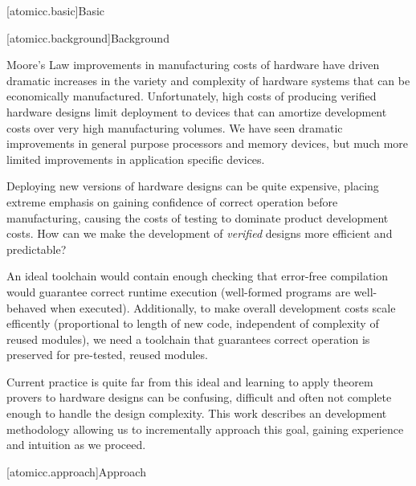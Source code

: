 [atomicc.basic]{Basic}

[atomicc.background]{Background}

Moore's Law improvements in manufacturing
costs of hardware have driven dramatic increases in the variety and complexity
of hardware systems that can be economically manufactured.
Unfortunately, high costs of producing verified hardware designs limit
deployment to devices that
can amortize development costs over very high manufacturing volumes.
We have seen dramatic improvements in general purpose processors
and memory devices, but much more limited improvements in application
specific devices.

Deploying new versions of hardware designs can be quite expensive,
placing extreme emphasis on gaining confidence of correct operation before
manufacturing, causing the costs of testing to
dominate product development costs.
How can we make the development of 
\textit{verified} designs more efficient and predictable?

An ideal toolchain would contain enough checking
that error-free compilation would guarantee correct runtime execution
(well-formed programs are well-behaved when executed).
Additionally, to make overall development costs scale efficently (proportional
to length of new code, independent of complexity of reused modules), we need a
toolchain that guarantees correct operation is preserved
for pre-tested, reused modules.

Current practice is quite far from this ideal and learning to apply
theorem provers to hardware designs can be confusing, difficult and
often not complete enough to handle the design complexity.
This work describes an development methodology allowing
us to incrementally approach this goal, gaining experience and intuition
as we proceed.

[atomicc.approach]{Approach}

